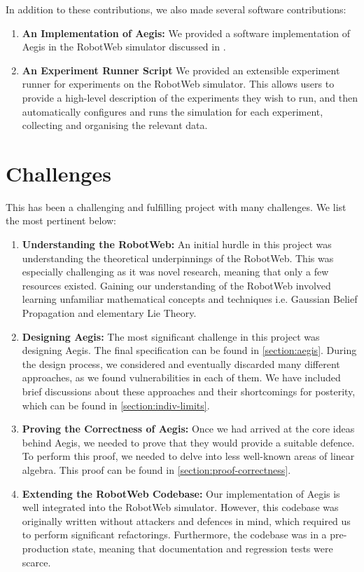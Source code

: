 In addition to these contributions, we also made several software contributions:
\begin{enumerate}
    \item \textbf{An Implementation of Aegis:} We provided a software implementation of Aegis in the RobotWeb simulator discussed in \cite{Robotweb}.
    \item \textbf{An Experiment Runner Script} We provided an extensible experiment runner for experiments on the RobotWeb simulator. This allows users to provide a high-level description of the experiments they wish to run, and then automatically configures and runs the simulation for each experiment, collecting and organising the relevant data.
\end{enumerate}

\section{Challenges}
This has been a challenging and fulfilling project with many challenges. We list the most pertinent below:
\begin{enumerate}
    \item \textbf{Understanding the RobotWeb:} An initial hurdle in this project was understanding the theoretical underpinnings of the RobotWeb. This was especially challenging as it was novel research, meaning that only a few resources existed. Gaining our understanding of the RobotWeb involved learning unfamiliar mathematical concepts and techniques i.e. Gaussian Belief Propagation and elementary Lie Theory.
    \item \textbf{Designing Aegis:} The most significant challenge in this project was designing Aegis. The final specification can be found in \autoref{section:aegis}. During the design process, we considered and eventually discarded many different approaches, as we found vulnerabilities in each of them. We have included brief discussions about these approaches and their shortcomings for posterity, which can be found in \autoref{section:indiv-limits}.
    \item \textbf{Proving the Correctness of Aegis:} Once we had arrived at the core ideas behind Aegis, we needed to prove that they would provide a suitable defence. To perform this proof, we needed to delve into less well-known areas of linear algebra. This proof can be found in \autoref{section:proof-correctness}.
    \item \textbf{Extending the RobotWeb Codebase:} Our implementation of Aegis is well integrated into the RobotWeb simulator. However, this codebase was originally written without attackers and defences in mind, which required us to perform significant refactorings. Furthermore, the codebase was in a pre-production state, meaning that documentation and regression tests were scarce.
\end{enumerate}

